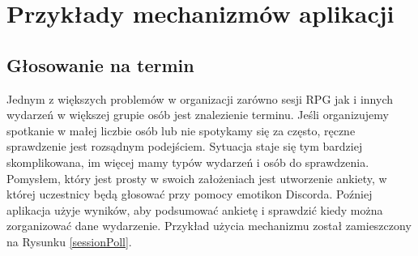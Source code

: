 \documentclass[shortabstract,inz]{iithesis}
\begin{document}
	
		\section{Przykłady mechanizmów aplikacji}
			\subsection{Głosowanie na termin}
			Jednym z większych problemów w organizacji zarówno sesji RPG jak i innych wydarzeń w większej grupie osób jest znalezienie terminu. Jeśli organizujemy spotkanie w małej liczbie osób lub nie spotykamy się za często, ręczne sprawdzenie jest rozsądnym podejściem. Sytuacja staje się tym bardziej skomplikowana, im więcej mamy typów wydarzeń i osób do sprawdzenia. Pomysłem, który jest prosty w swoich założeniach jest utworzenie ankiety, w której uczestnicy będą głosować przy pomocy emotikon Discorda. Poźniej aplikacja użyje wyników, aby podsumować ankietę i sprawdzić kiedy można zorganizować dane wydarzenie. Przykład użycia mechanizmu został zamieszczony na Rysunku \ref{sessionPoll}.
		
\end{document}
